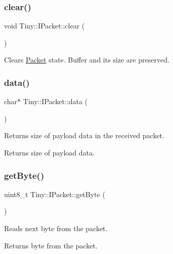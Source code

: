 \subsubsection{\texorpdfstring{clear()}{clear()}}
{\footnotesize\ttfamily void Tiny\+::\+I\+Packet\+::clear (\begin{DoxyParamCaption}{ }\end{DoxyParamCaption})\hspace{0.3cm}{\ttfamily [inline]}}

Clears \hyperlink{classTiny_1_1Packet}{Packet} state. Buffer and its size are preserved. \mbox{\label{classTiny_1_1IPacket_aedf2ba31c5a29e3829458bd9f03a7051}} 
\subsubsection{\texorpdfstring{data()}{data()}}
{\footnotesize\ttfamily char$\ast$ Tiny\+::\+I\+Packet\+::data (\begin{DoxyParamCaption}{ }\end{DoxyParamCaption})\hspace{0.3cm}{\ttfamily [inline]}}

Returns size of payload data in the received packet. \begin{DoxyReturn}{Returns}
size of payload data. 
\end{DoxyReturn}
\mbox{\label{classTiny_1_1IPacket_ac3088a86a37df4d08d0f6ca961abf006}} 
\subsubsection{\texorpdfstring{get\+Byte()}{getByte()}}
{\footnotesize\ttfamily uint8\+\_\+t Tiny\+::\+I\+Packet\+::get\+Byte (\begin{DoxyParamCaption}{ }\end{DoxyParamCaption})\hspace{0.3cm}{\ttfamily [inline]}}

Reads next byte from the packet. \begin{DoxyReturn}{Returns}
byte from the packet. 
\end{DoxyReturn}
\mbox{\label{classTiny_1_1IPacket_a0fea05a806c533be32c68bb3899bd596}} 
